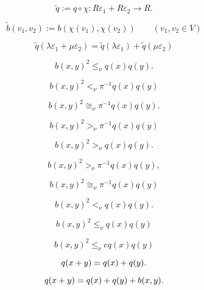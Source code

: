 \documentclass{article}
\begin{document}
\begin{equation}\label{eq:II.5.3} {\tilde q} :=q\circ\chi:R{\varepsilon}_1+R{\varepsilon}_2\to R.\end{equation}

\begin{equation}\label{eq:II.5.4}
{\tilde b}(v_1,v_2):=b(\chi(v_1),\chi(v_2)) \qquad (v_1,v_2\in V) \end{equation}

$${\tilde q} ({\lambda} {\varepsilon}_1+ \mu {\varepsilon}_2)={\tilde q} ({\lambda} {\varepsilon}_1)+{\tilde q} (\mu {\varepsilon}_2)$$

\begin{equation}\label{eq:II.5.5}
b(x,y)^2\le_\nu q(x)q(y).\end{equation}

\begin{equation}\label{eq:II.5.6}
b(x,y)^2<_\nu \pi^{-1}q(x)q(y)\end{equation}

\begin{equation}\label{eq:II.5.7}
b(x,y)^2\cong_\nu \pi^{-1}q(x)q(y).\end{equation}

\begin{equation}\label{eq:II.5.8}
 b(x,y)^2>_\nu \pi^{-1}q(x)q(y)\end{equation}

$$b(x,y)^2>_\nu q(x)q(y).$$

$$b(x,y)^2>_\nu \pi^{-1}q(x)q(y),$$

$$b(x,y)^2\cong_\nu \pi^{-1}q(x)q(y)$$

\begin{equation}\label{eq:II.5.9}
b(x,y)^2 {<_\nu} q(x)q(y).\end{equation}

\begin{equation}\label{eq:II.5.10}
b(x,y)^2 {\leq_\nu} q(x)q(y)\end{equation}

\begin{equation}\label{eq:II.5.11}
b(x,y)^2 {\leq_\nu} c q(x)q(y)\end{equation}

\begin{equation}\addtocounter{equation}{-1}\label{eq:str.1}
q(x+y) = q(x) + q(y).
\end{equation}

\begin{equation}\addtocounter{equation}{-1}\label{eq:str.1}
q(x+y) = q(x) + q(y) + b(x,y).
\end{equation}
\end{document}
